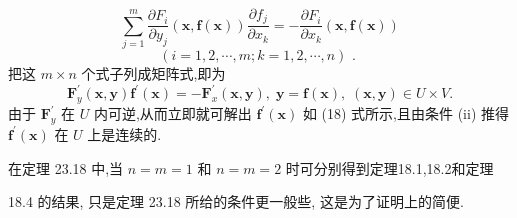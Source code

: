 \[
\mathop{\sum }\limits_{{j = 1}}^{m}\frac{\partial {F}_{i}}{\partial {y}_{j}}\left( {\mathbf{x},\mathbf{f}\left( \mathbf{x}\right) }\right) \frac{\partial {f}_{j}}{\partial {x}_{k}} =  - \frac{\partial {F}_{i}}{\partial {x}_{k}}\left( {\mathbf{x},\mathbf{f}\left( \mathbf{x}\right) }\right)  \tag{24}
\]
\[
\left( {i = 1,2,\cdots ,m;k = 1,2,\cdots ,n}\right) \text{ . }
\]
把这 \(m \times  n\) 个式子列成矩阵式,即为
\[
{\mathbf{F}}_{y}^{\prime }\left( {\mathbf{x},\mathbf{y}}\right) {\mathbf{f}}^{\prime }\left( \mathbf{x}\right)  =  - {\mathbf{F}}_{x}^{\prime }\left( {\mathbf{x},\mathbf{y}}\right) ,\;\mathbf{y} = \mathbf{f}\left( \mathbf{x}\right) ,\;\left( {\mathbf{x},\mathbf{y}}\right)  \in  U \times  V.
\]
由于 \({\mathbf{F}}_{y}^{\prime }\) 在 \(U\) 内可逆,从而立即就可解出 \({\mathbf{f}}^{\prime }\left( \mathbf{x}\right)\) 如 (18) 式所示,且由条件 (ii) 推得 \({\mathbf{f}}^{\prime }\left( \mathbf{x}\right)\) 在 \(U\) 上是连续的.

在定理 23.18 中,当 \(n = m = 1\) 和 \(n = m = 2\) 时可分别得到定理18.1,18.2和定理

18.4 的结果, 只是定理 23.18 所给的条件更一般些, 这是为了证明上的简便.

